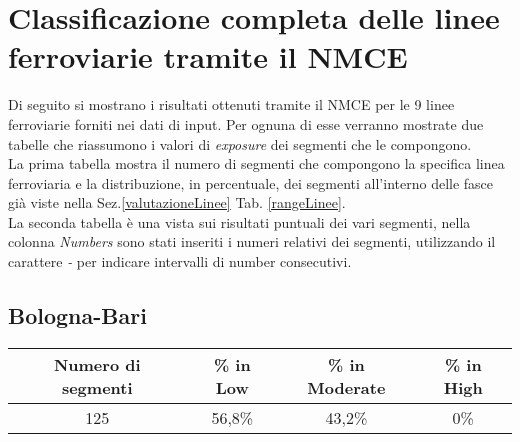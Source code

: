 \newpage

\section{Classificazione completa delle linee ferroviarie tramite il NMCE}
Di seguito si mostrano i risultati ottenuti tramite il NMCE per le 9 linee ferroviarie forniti nei dati di input. Per ognuna di esse verranno mostrate due tabelle che riassumono i valori di \textit{exposure} dei segmenti  che le compongono.\\
La prima tabella mostra il numero di segmenti che compongono la specifica linea ferroviaria e la distribuzione, in percentuale, dei segmenti all'interno delle fasce già viste  nella Sez.\ref{valutazioneLinee}  Tab. \ref{rangeLinee}.\\
La seconda tabella è una vista sui risultati puntuali dei vari segmenti, nella colonna \textit{Numbers} sono stati inseriti i numeri relativi dei segmenti, utilizzando il carattere \textit{-} per indicare intervalli di number consecutivi. 

\subsection{Bologna-Bari}
\label{app:bolognabari}
\centering
	\begin{tabular}  {|c|c|c|c|} 
	
		\hline 
		Numero di segmenti & \% in Low & \% in Moderate & \% in High \\ 
		\hline 
		125 & 56,8\% & 43,2\% & 0\% \\ 
		\hline 
	\end{tabular} 

